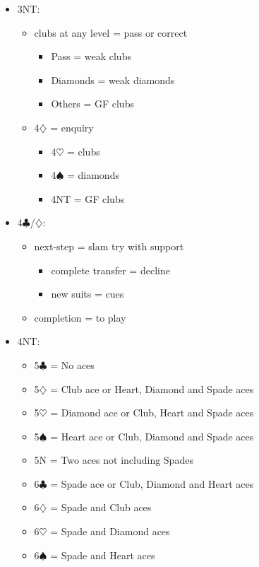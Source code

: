 \documentclass[a4paper,14pt]{extarticle}
\begin{document}
\begin{itemize}
\item 3NT:
	\begin{itemize}
	\item clubs at any level = pass or correct
		\begin{itemize}
		\item Pass = weak clubs
		\item Diamonds = weak diamonds
		\item Others = GF clubs
		\end{itemize}
	\item 4$\diamondsuit$ = enquiry
		\begin{itemize}
		\item 4$\heartsuit$ = clubs
		\item 4$\spadesuit$ = diamonds
		\item 4NT = GF clubs
		\end{itemize}
	\end{itemize}

\item 4$\clubsuit$/$\diamondsuit$:
	\begin{itemize}
	\item next-step = slam try with support
		\begin{itemize}
		\item complete transfer = decline
		\item new suits = cues
		\end{itemize}
	\item completion = to play
	\end{itemize}

\item 4NT:
	\begin{itemize}
	\item 5$\clubsuit$ = No aces
	\item 5$\diamondsuit$ = Club ace or Heart, Diamond and Spade aces
	\item 5$\heartsuit$ = Diamond ace or Club, Heart and Spade aces
	\item 5$\spadesuit$ = Heart ace or Club, Diamond and Spade aces
	\item 5N = Two aces not including Spades
	\item 6$\clubsuit$ = Spade ace or Club, Diamond and Heart aces
	\item 6$\diamondsuit$ = Spade and Club aces
	\item 6$\heartsuit$ = Spade and Diamond aces
	\item 6$\spadesuit$ = Spade and Heart aces
	\end{itemize}

\end{itemize}
\end{document}
